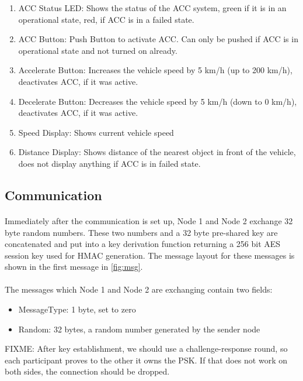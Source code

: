 \begin{enumerate}
  \item ACC Status LED: Shows the status of the ACC system, green if it is in an operational state, red, if ACC  is in a failed state.
  \item ACC Button: Push Button to activate ACC. Can only be pushed if ACC is in operational state and not turned on already.
  \item Accelerate Button: Increases the vehicle speed by 5 km/h (up to 200 km/h), deactivates ACC, if it was active.
  \item Decelerate Button: Decreases the vehicle speed by 5 km/h (down to 0 km/h), deactivates ACC, if it was active.
  \item Speed Display: Shows current vehicle speed
  \item Distance Display: Shows distance of the nearest object in front of the vehicle, does not display anything if ACC is in failed state.
\end{enumerate}

\subsection{Communication}

\paragraph{} Immediately after the communication is set up, Node 1 and Node 2 exchange 32 byte random numbers. These two numbers and a 32 byte pre-shared key are concatenated and put into a key derivation function returning a 256 bit AES session key used for HMAC generation. The message layout for these messages is shown in the first message in \ref{fig:msg}.

\paragraph{}The messages which Node 1 and Node 2 are exchanging contain two fields:
\begin{itemize}
	\item MessageType: 1 byte, set to zero
	\item Random: 32 bytes, a random number generated by the sender node
\end{itemize}

FIXME: After key establishment, we should use a challenge-response round, so each participant proves to the other it owns the PSK. If that does not work on both sides, the connection should be dropped.

